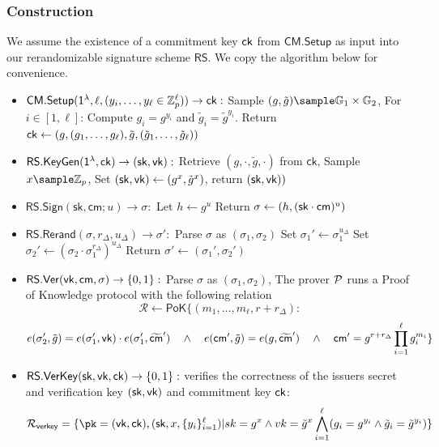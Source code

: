 \subsubsection{Construction}\label{sig-construction}
We assume the existence of a commitment key $\mathsf{ck}$ from $\mathsf{CM.Setup}$ as input into our rerandomizable signature scheme $\mathsf{RS}$. We copy the algorithm below for convenience.
\begin{itemize}
    \item $\mathsf{CM.Setup}(\mathsf{1^{\lambda}}, \ell, (y_i, \ldots, y_{\ell} \in \mathbb{Z}_p^{\ell})) \to \mathsf{ck}:$  
    Sample $(g, \tilde{g}) \sample \G_1 \times \G_2$, For $i \in [1,\ell]$: Compute $g_i = g^{y_i}$ and $\tilde{g}_i = \tilde{g}^{y_i}$. Return $\mathsf{ck} \gets (g, (g_1,\ldots,g_\ell), \tilde{g}, (\tilde{g}_1,\ldots,\tilde{g}_\ell))$
    
    \item $\mathsf{RS.KeyGen}(\mathsf{1^{\lambda}}, \mathsf{ck}) \to (\mathsf{sk}, \mathsf{vk}):$ 
        Retrieve $(g, \cdot, \tilde{g}, \cdot)$ from $\mathsf{ck}$,
        Sample $x \sample \Z_p$,
        Set $(\mathsf{sk}, \mathsf{vk}) \gets (g^x, \tilde{g}^x)$, return $(\mathsf{sk}, \mathsf{vk}))$
    
    \item $\mathsf{RS.Sign}(\mathsf{sk}, \mathsf{cm}; u) \to \sigma:$ 
        Let $h \gets g^u$
        Return $\sigma \gets (h, (\mathsf{sk} \cdot \mathsf{cm})^u)$
    
    \item $\mathsf{RS.Rerand}(\sigma, r_\Delta, u_\Delta) \to \sigma':$
        Parse $\sigma$ as $(\sigma_1, \sigma_2)$
        Set $\sigma_1' \gets \sigma_1^{u_\Delta}$
        Set $\sigma_2' \gets (\sigma_2 \cdot \sigma_1^{r_\Delta})^{u_\Delta}$
        Return $\sigma' \gets (\sigma_1', \sigma_2')$
    
    \item $\mathsf{RS.Ver}(\mathsf{vk}, \mathsf{cm}, \sigma) \to \{0,1\}:$
        Parse $\sigma$ as $(\sigma_1, \sigma_2)$, The prover $\mathcal{P}$ runs a Proof of Knowledge protocol with the following relation 
    \[
        \mathcal{R} \gets \mathsf{PoK}\{(m_1,\ldots,m_\ell, r + r_\Delta): 
    \]
    \[
         e(\sigma_2', \tilde{g}) = e(\sigma_1', \mathsf{vk})\cdot e(\sigma_1', \widetilde{\mathsf{cm}}') \quad \wedge \quad
        e(\mathsf{cm}', \tilde{g}) = e(g, \widetilde{\mathsf{cm}}') \quad \wedge \quad
        \mathsf{cm}' = g^{r + r_\Delta} \prod_{i=1}^\ell g_i^{m_i}
        \}
    \]

        \item $\mathsf{RS.VerKey}(\mathsf{sk}, \mathsf{vk}, \mathsf{ck}) \to \{0,1\}:$ verifies the correctness of the issuers secret and verification key $(\mathsf{sk}, \mathsf{vk})$ and commitment key $\mathsf{ck}$:
        \[
        \mathcal{R}_{\mathsf{verkey}} = \{\pk = (\vk, \ck),(\sk, x, \{y_i\}_{i=1}^\ell) | sk = g^x \wedge vk = \tilde{g}^x \bigwedge_{i=1}^\ell (g_i = g^{y_i} \wedge \tilde{g}_i = \tilde{g}^{y_i})\}
        \]
        
\end{itemize}



